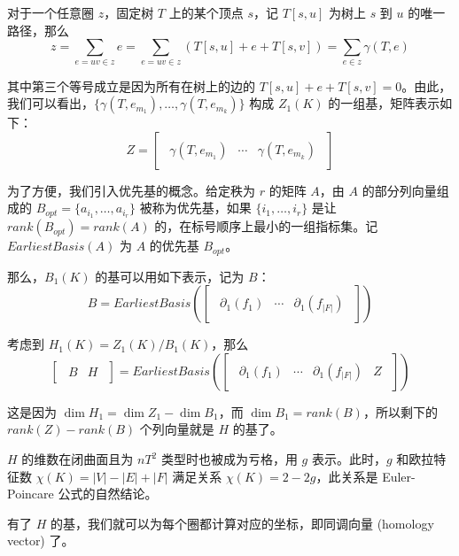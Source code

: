 对于一个任意圈 $ z $，固定树 $ T $ 上的某个顶点 $ s $，记 $ T[s, u] $ 为树上 $ s $ 到 $ u $ 的唯一路径，那么
$$
z = \sum_{e=uv \in z} e = \sum_{e=uv \in z} (T[s, u] + e + T[s, v]) = \sum_{e \in z} \gamma(T, e)
$$

其中第三个等号成立是因为所有在树上的边的 $ T[s, u] + e + T[s, v] = 0 $。由此，我们可以看出，$ \{ \gamma(T, e_{m_1}), \dots, \gamma(T, e_{m_{k}}) \} $ 构成 $ Z_1(K) $ 的一组基，矩阵表示如下：
$$
Z = 
\begin{bmatrix}
\begin{array}{c|c|c}
    \gamma(T, e_{m_1}) & \cdots & \gamma(T, e_{m_{k}})
\end{array}
\end{bmatrix}
$$

为了方便，我们引入优先基的概念。给定秩为 $ r $ 的矩阵 $ A $，由 $ A $ 的部分列向量组成的 $ B_{opt} = \{a_{i_1}, \dots, a_{i_r}\} $ 被称为优先基，如果 $ \{ i_1, \dots, i_r \} $ 是让 $ rank(B_{opt}) = rank(A) $ 的，在标号顺序上最小的一组指标集。记 $ EarliestBasis(A) $ 为 $ A $ 的优先基 $ B_{opt} $。

那么，$ B_1(K) $ 的基可以用如下表示，记为 $ B $：
$$
B = 
EarliestBasis(\begin{bmatrix}
    \begin{array}{c|c|c}
    \partial_1(f_1) & \cdots & \partial_1(f_{|F|})
\end{array}
\end{bmatrix})
$$

考虑到 $ H_1(K) = Z_1(K) / B_1(K) $，那么
$$
\begin{bmatrix}
    \begin{array}{c|c}
        B & H
    \end{array}
\end{bmatrix} =
EarliestBasis(\begin{bmatrix}
    \begin{array}{ccc|c}
        \partial_1(f_1) & \cdots & \partial_1(f_{|F|}) & Z
    \end{array}
\end{bmatrix})
$$

这是因为 $ \dim H_1 = \dim Z_1 - \dim B_1 $，而 $ \dim B_1 = rank(B) $，所以剩下的 $ rank(Z) - rank(B) $ 个列向量就是 $ H $ 的基了。

$ H $ 的维数在闭曲面且为 $ nT^2 $ 类型时也被成为亏格，用 $ g $ 表示。此时，$ g $ 和欧拉特征数 $ \chi(K) = |V| - |E| + |F| $ 满足关系 $ \chi(K) = 2 - 2g $，此关系是 Euler-Poincare 公式的自然结论。

有了 $ H $ 的基，我们就可以为每个圈都计算对应的坐标，即同调向量 (homology vector) 了。

